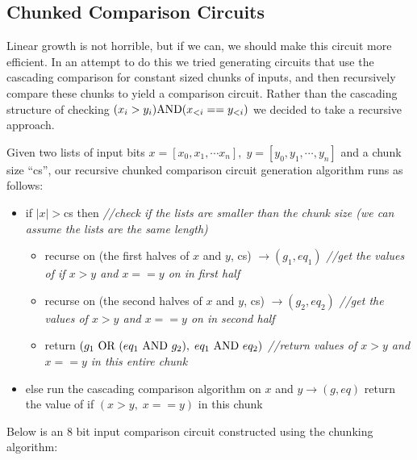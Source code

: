 \documentclass[12pt,twoside]{reedthesis}
\begin{document}
 \subsection{Chunked Comparison Circuits}
 \par Linear growth is not horrible, but if we can, we should make this circuit more efficient. In an attempt to do this we tried generating circuits that use the cascading comparison for constant sized chunks of inputs, and then recursively compare these chunks to yield a comparison circuit. Rather than the cascading structure of checking $(x_i> y_i) \text{AND} (x_{<i} == y_{<i})$ we decided to take a recursive approach. 
 \par Given two lists of input bits $ x =[x_0,x_1, \cdots x_n], \; y= [y_0,y_1,\cdots , y_n]$ and a chunk size ``cs'',
our recursive chunked comparison circuit generation algorithm runs as follows:
  \begin{itemize}
 \item if $|x|>$cs then \textit{ //check if the lists are smaller than the chunk size (we can assume the lists are the same length)}
 	\begin{itemize}
	\item recurse on (the first halves of $x$ and $y$, cs) $\to (g_1,eq_1)$ \textit{//get the values of if $x>y$ and $x==y$ on in first half}
	\item recurse on (the second halves of $x$ and $y$, cs) $\to (g_2, eq_2)$ \textit{//get the values of $x>y$ and $x==y$ on in second half}
	\item return $(g_1\ \text{OR}\ (eq_1\ \text{AND}\ g_2), \; eq_1\ \text{AND} \ eq_2)$ \textit{//return values of $x>y$ and $x==y$ in this entire chunk}
	\end{itemize} 
\item else run the cascading comparison algorithm on $x$ and $y \to (g,eq)$ return the value of if $(x>y, \; x==y)$ in this chunk
 \end{itemize}
 
 \par Below is an 8 bit input comparison circuit constructed using the chunking algorithm:
 
\end{document}
